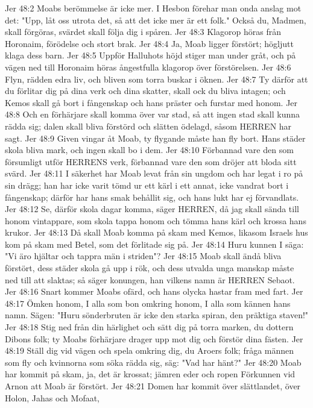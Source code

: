 Jer 48:2  Moabs berömmelse är icke mer. I Hesbon förehar man onda anslag mot det: "Upp, låt oss utrota det, så att det icke mer är ett folk." Också du, Madmen, skall förgöras, svärdet skall följa dig i spåren.
Jer 48:3  Klagorop höras från Horonaim, förödelse och stort brak.
Jer 48:4  Ja, Moab ligger förstört; högljutt klaga dess barn.
Jer 48:5  Uppför Halluhots höjd stiger man under gråt, och på vägen ned till Horonaim höras ångestfulla klagorop över förstörelsen.
Jer 48:6  Flyn, rädden edra liv, och bliven som torra buskar i öknen.
Jer 48:7  Ty därför att du förlitar dig på dina verk och dina skatter, skall ock du bliva intagen; och Kemos skall gå bort i fångenskap och hans präster och furstar med honom.
Jer 48:8  Och en förhärjare skall komma över var stad, så att ingen stad skall kunna rädda sig; dalen skall bliva förstörd och slätten ödelagd, såsom HERREN har sagt.
Jer 48:9  Given vingar åt Moab, ty flygande måste han fly bort. Hans städer skola bliva mark, och ingen skall bo i dem.
Jer 48:10  Förbannad vare den som försumligt utför HERRENS verk, förbannad vare den som dröjer att bloda sitt svärd.
Jer 48:11  I säkerhet har Moab levat från sin ungdom och har legat i ro på sin drägg; han har icke varit tömd ur ett kärl i ett annat, icke vandrat bort i fångenskap; därför har hans smak behållit sig, och hans lukt har ej förvandlats.
Jer 48:12  Se, därför skola dagar komma, säger HERREN, då jag skall sända till honom vintappare, som skola tappa honom och tömma hans kärl och krossa hans krukor.
Jer 48:13  Då skall Moab komma på skam med Kemos, likasom Israels hus kom på skam med Betel, som det förlitade sig på.
Jer 48:14  Huru kunnen I säga: "Vi äro hjältar och tappra män i striden"?
Jer 48:15  Moab skall ändå bliva förstört, dess städer skola gå upp i rök, och dess utvalda unga manskap måste ned till att slaktas; så säger konungen, han vilkens namn är HERREN Sebaot.
Jer 48:16  Snart kommer Moabs ofärd, och hans olycka hastar fram med fart.
Jer 48:17  Ömken honom, I alla som bon omkring honom, I alla som kännen hans namn. Sägen: "Huru sönderbruten är icke den starka spiran, den präktiga staven!"
Jer 48:18  Stig ned från din härlighet och sätt dig på torra marken, du dottern Dibons folk; ty Moabs förhärjare drager upp mot dig och förstör dina fästen.
Jer 48:19  Ställ dig vid vägen och spela omkring dig, du Aroers folk; fråga männen som fly och kvinnorna som söka rädda sig, säg: "Vad har hänt?"
Jer 48:20  Moab har kommit på skam, ja, det är krossat; jämren eder och ropen Förkunnen vid Arnon att Moab är förstört.
Jer 48:21  Domen har kommit över slättlandet, över Holon, Jahas och Mofaat,
